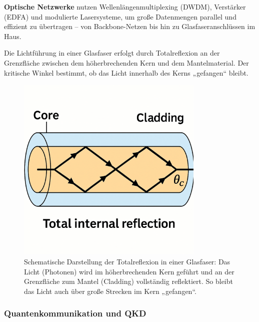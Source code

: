 \textbf{Optische Netzwerke} nutzen Wellenlängenmultiplexing (DWDM), Verstärker (EDFA) und modulierte Lasersysteme, um große Datenmengen parallel und effizient zu übertragen – von Backbone-Netzen bis hin zu Glasfaseranschlüssen im Haus.
\vspace{1em}
\begin{tcolorbox}[physikbox, title=Totalreflexion in Glasfasern]
	\label{box:glasfaser}
	\small
	Die Lichtführung in einer Glasfaser erfolgt durch Totalreflexion an der Grenzfläche zwischen dem höherbrechenden Kern und dem Mantelmaterial. Der kritische Winkel bestimmt, ob das Licht innerhalb des Kerns „gefangen“ bleibt.
\end{tcolorbox}
\begin{figure}[H]
	\centering
	\includegraphics[width=0.8\textwidth]{bilder/glasfaser.png}
	\caption{Schematische Darstellung der Totalreflexion in einer Glasfaser: Das Licht (Photonen) wird im höherbrechenden Kern geführt und an der Grenzfläche zum Mantel (Cladding) vollständig reflektiert. So bleibt das Licht auch über große Strecken im Kern „gefangen“.}
	\label{fig:totalreflexion}
\end{figure}

\subsubsection{Quantenkommunikation und QKD}

